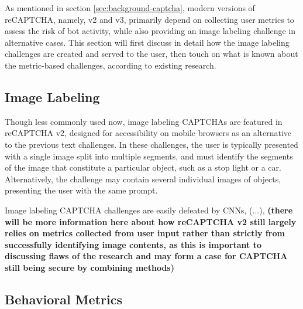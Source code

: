 \documentclass[sigplan,screen,nonacm]{acmart-tagged}
\begin{document}

As mentioned in section \ref{sec:background-captcha}, modern versions of reCAPTCHA, namely, v2 and v3, primarily depend on collecting user metrics to assess the risk of bot activity, while also providing an image labeling challenge in alternative cases. This section will first discuss in detail how the image labeling challenges are created and served to the user, then touch on what is known about the metric-based challenges, according to existing research.

\subsection{Image Labeling}
\label{sec:visual}

Though less commonly used now, image labeling CAPTCHAs are featured in reCAPTCHA v2, designed for accessibility on mobile browsers as an alternative to the previous text challenges. In these challenges, the user is typically presented with a single image split into multiple segments, and must identify the segments of the image that constitute a particular object, such as a stop light or a car. Alternatively, the challenge may contain several individual images of objects, presenting the user with the same prompt. 

Image labeling CAPTCHA challenges are easily defeated by CNNs, (...), \textbf{(there will be more information here about how reCAPTCHA v2 still largely relies on metrics collected from user input rather than strictly from successfully identifying image contents, as this is important to discussing flaws of the research and may form a case for CAPTCHA still being secure by combining methods)}


\subsection{Behavioral Metrics}
\label{sec:metrics}
\end{document}
